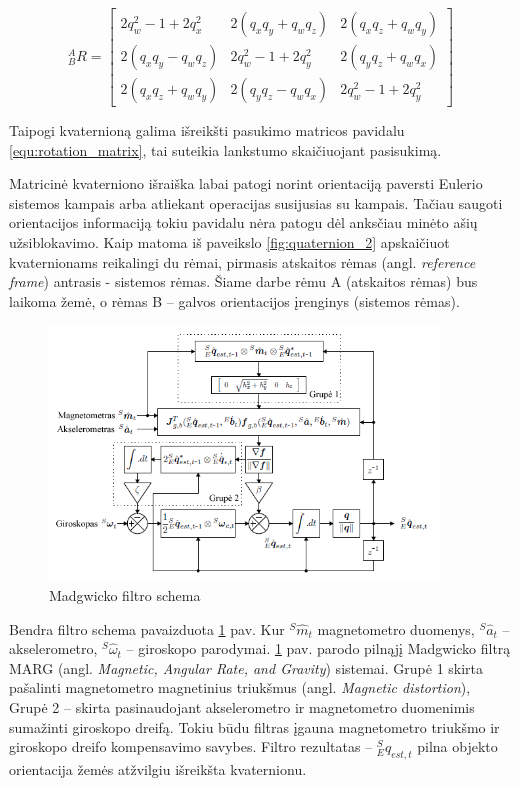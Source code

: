 \documentclass[]{vgtuef}
\begin{document}
\begin{equation}
_{B}^{A}R = \begin{bmatrix} 
   2q_{w}^{2} - 1 + 2q_{x}^{2} & 2(q_{x}q_{y}+q_{w}q_{z}) & 2(q_{x}q_{z}+q_{w}q_{y})
\\ 2(q_{x}q_{y}-q_{w}q_{z}) & 2q_{w}^{2} - 1 + 2q_{y}^{2} & 2(q_{y}q_{z}+q_{w}q_{x})
\\ 2(q_{x}q_{z}+q_{w}q_{y}) & 2(q_{y}q_{z}-q_{w}q_{x}) & 2q_{w}^{2} - 1 + 2q_{y}^{2}
\end{bmatrix}
\label{equ:rotation_matrix}
\end{equation}

Taipogi kvaternioną galima išreikšti pasukimo matricos pavidalu \ref{equ:rotation_matrix}, tai suteikia lankstumo skaičiuojant pasisukimą.

Matricinė kvaterniono išraiška labai patogi norint orientaciją paversti Eulerio sistemos kampais arba atliekant operacijas susijusias su kampais. Tačiau saugoti orientacijos informaciją tokiu pavidalu nėra patogu dėl anksčiau minėto ašių užsiblokavimo. 
Kaip matoma iš paveikslo \ref{fig:quaternion_2} apskaičiuot kvaternionams reikalingi du rėmai, pirmasis atskaitos rėmas (angl. \textit{reference frame}) antrasis - sistemos rėmas. Šiame darbe rėmu A (atskaitos rėmas) bus laikoma žemė, o rėmas B – galvos orientacijos įrenginys (sistemos rėmas).

\begin{figure}[htbp]
  \centering
  \includegraphics[width=390px]{img/madgwick.png}
  \caption{Madgwicko filtro schema}
  \label{fig:madgwick}
\end{figure}

Bendra filtro schema pavaizduota \ref{fig:madgwick} pav. Kur $^{S}\hat{m}_{t}$ magnetometro duomenys, $^{S}\hat{a}_{t}$ – akselerometro, $^{S}\hat{\omega}_{t}$  – giroskopo parodymai. \ref{fig:madgwick} pav. parodo pilnąjį Madgwicko filtrą MARG (angl. \textit{Magnetic, Angular Rate, and Gravity}) sistemai. Grupė 1 skirta pašalinti magnetometro magnetinius triukšmus (angl. \textit{Magnetic distortion}), Grupė 2 – skirta pasinaudojant akselerometro ir magnetometro duomenimis sumažinti giroskopo dreifą. Tokiu būdu filtras įgauna magnetometro triukšmo ir giroskopo dreifo kompensavimo savybes. Filtro rezultatas – $_{E}^{S}\hat{q}_{est,t}$ pilna objekto orientacija žemės atžvilgiu išreikšta kvaternionu. 
\end{document}
